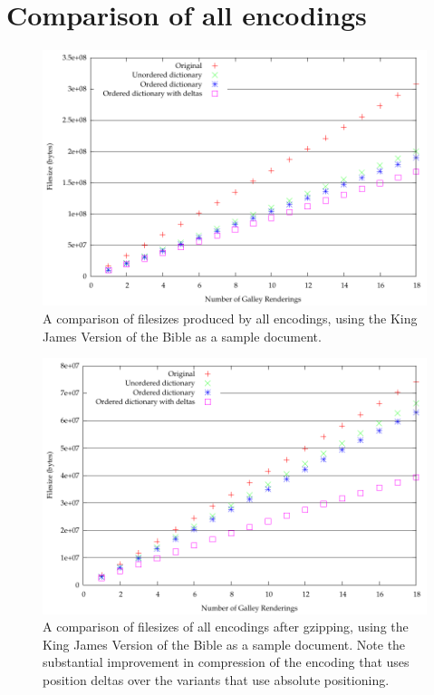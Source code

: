 \newpage
\section{Comparison of all encodings}

\begin{figure}[bht]
  \begin{center}
  \includegraphics[width=\textwidth]{gnuplot/kjv-b}
  \end{center}
  \caption[Comparison of filesizes from all encodings]{A comparison of filesizes produced by all encodings, using the King James Version of the Bible as a sample document.}
  \label{fig:size-all-b}
\end{figure}

\begin{figure}
  \begin{center}
  \includegraphics[width=\textwidth]{gnuplot/kjv-gz}
  \end{center}
  \caption[Comparison of gzipped filesizes from all encodings]{A comparison of filesizes of all encodings after gzipping, using the King James Version of the Bible as a sample document. Note the substantial improvement in compression of the encoding that uses position deltas over the variants that use absolute positioning.}
  \label{fig:size-all-gz}
\end{figure}


